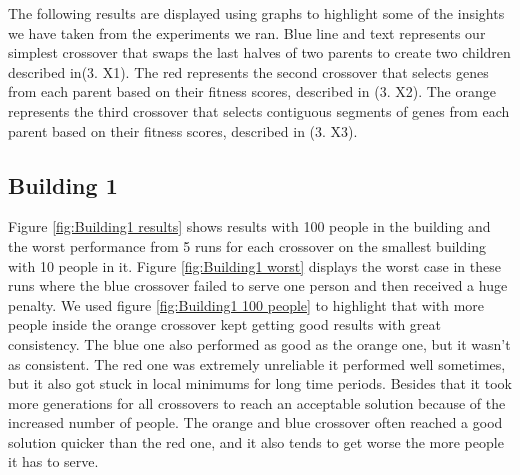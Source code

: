
The following results are displayed using graphs to highlight some of the insights we have taken from the experiments we ran. Blue line and text represents our simplest crossover that swaps the last halves of two parents to create two children described in(3. X1). The red represents the second crossover that selects genes from each parent based on their fitness scores, described in (3. X2). The orange represents the third crossover that selects contiguous segments of genes from each parent based on their fitness scores, described in (3. X3).

\newpage

\subsection{Building 1}
Figure \ref{fig:Building1 results} shows results with 100 people in the building and the worst performance from 5 runs for each crossover on the smallest building with 10 people in it. Figure \ref{fig:Building1 worst} displays the worst case in these runs where the blue crossover failed to serve one person and then received a huge penalty. We used figure \ref{fig:Building1 100 people} to highlight that with more people inside the orange crossover kept getting good results with great consistency. The blue one also performed as good as the orange one, but it wasn't as consistent. The red one was extremely unreliable it performed well sometimes, but it also got stuck in local minimums for long time periods. Besides that it took more generations for all crossovers to reach an acceptable solution because of the increased number of people. The orange and blue crossover often reached a good solution quicker than the red one, and it also tends to get worse the more people it has to serve.

